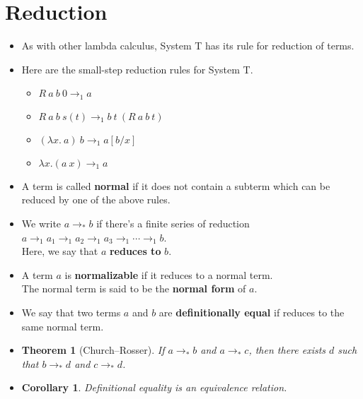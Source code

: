 \documentclass[10pt]{article}
\newtheorem{theorem}[lemma]{Theorem}
\newtheorem{corollary}[lemma]{Corollary}
\begin{document}
  \section{Reduction}

    \begin{itemize}
      \item As with other lambda calculus, System T has its rule for reduction of terms.
      
      \item Here are the small-step reduction rules for System T.
        \begin{itemize}
          \item $R\ a\ b\ 0 \rightarrow_1 a$
          \item $R\ a\ b\ s(t) \rightarrow_1 b\ t\ (R\ a\ b\ t)$
          \item $(\lambda x.\ a)\ b \rightarrow_1 a[b/x]$
          \item $\lambda x. (a\ x) \rightarrow_1 a$
        \end{itemize}
        
      \item A term is called {\bf normal} if it does not contain a subterm which can be reduced by one of the above rules.          
      
      \item We write $a \rightarrow_* b$ if there's a finite series of reduction
        $a \rightarrow_1 a_1 \rightarrow_1 a_2 \rightarrow_1 a_3 \rightarrow_1 \dotsb \rightarrow_1 b$.\\
        Here, we say that $a$ {\bf reduces to} $b$.
      
      \item A term $a$ is {\bf normalizable} if it reduces to a normal term.\\
        The normal term is said to be the {\bf normal form} of $a$.
              
      \item We say that two terms $a$ and $b$ are {\bf definitionally equal} if reduces to the same normal term.
        
      \item \begin{theorem}[Church--Rosser]
        If $a \rightarrow_* b$ and $a \rightarrow_* c$, then there exists $d$ such that $b \rightarrow_* d$ and $c \rightarrow_* d$.
      \end{theorem}            
      
      \item \begin{corollary}
        Definitional equality is an equivalence relation.
      \end{corollary}
      

\end{itemize}
\end{document}
